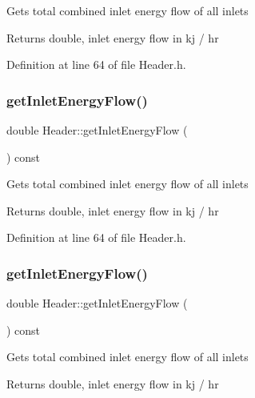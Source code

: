 Gets total combined inlet energy flow of all inlets \begin{DoxyReturn}{Returns}
double, inlet energy flow in kj / hr 
\end{DoxyReturn}


Definition at line 64 of file Header.\+h.

\mbox{\label{class_header_a2a30ee96fa76bab1533cb9ceea0c8af3}} 
\subsubsection{\texorpdfstring{get\+Inlet\+Energy\+Flow()}{getInletEnergyFlow()}\hspace{0.1cm}{\footnotesize\ttfamily [2/3]}}
{\footnotesize\ttfamily double Header\+::get\+Inlet\+Energy\+Flow (\begin{DoxyParamCaption}{ }\end{DoxyParamCaption}) const\hspace{0.3cm}{\ttfamily [inline]}}

Gets total combined inlet energy flow of all inlets \begin{DoxyReturn}{Returns}
double, inlet energy flow in kj / hr 
\end{DoxyReturn}


Definition at line 64 of file Header.\+h.

\mbox{\label{class_header_a2a30ee96fa76bab1533cb9ceea0c8af3}} 
\subsubsection{\texorpdfstring{get\+Inlet\+Energy\+Flow()}{getInletEnergyFlow()}\hspace{0.1cm}{\footnotesize\ttfamily [3/3]}}
{\footnotesize\ttfamily double Header\+::get\+Inlet\+Energy\+Flow (\begin{DoxyParamCaption}{ }\end{DoxyParamCaption}) const\hspace{0.3cm}{\ttfamily [inline]}}

Gets total combined inlet energy flow of all inlets \begin{DoxyReturn}{Returns}
double, inlet energy flow in kj / hr 
\end{DoxyReturn}


